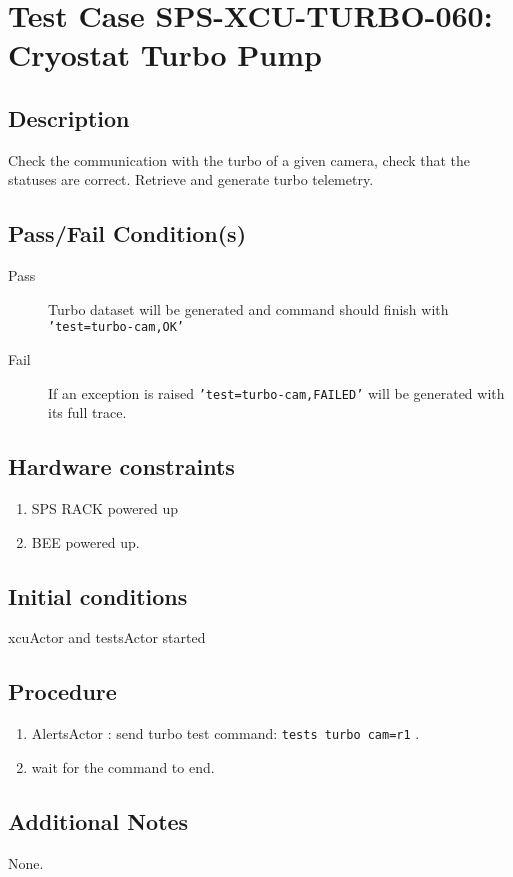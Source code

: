 \section{Test Case SPS-XCU-TURBO-060: Cryostat Turbo Pump}

\subsection{Description}

Check the communication with the turbo of a given camera, check that the statuses are correct.
Retrieve and generate turbo telemetry.

\subsection{Pass/Fail Condition(s)}

\begin{description}
\item [Pass] Turbo dataset will be generated and command should finish with \texttt{'test=turbo-cam,OK'}
\item [Fail] If an exception is raised \texttt{'test=turbo-cam,FAILED'} will be generated with its full trace.

\end{description}

\subsection{Hardware constraints}

\begin{enumerate}
    \item SPS RACK powered up
    \item BEE powered up.
\end{enumerate}

\subsection{Initial conditions}

xcuActor and testsActor started

\subsection{Procedure}

\begin{enumerate}
    \item AlertsActor : send turbo test command: \texttt{tests turbo cam=r1} .
    \item wait for the command to end.
\end{enumerate}

\subsection{Additional Notes}
None.
